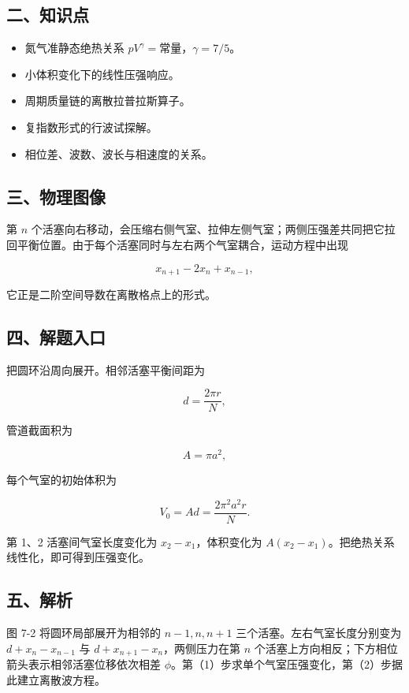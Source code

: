 \documentclass[12pt,a4paper,UTF8]{ctexart}
\newcommand{\tightlist}{\setlength{\itemsep}{0pt}\setlength{\parskip}{0pt}}
\begin{document}
\subsection{二、知识点}\label{ux4e8cux77e5ux8bc6ux70b9-6}

\begin{itemize}
\tightlist
\item
  氮气准静态绝热关系 \(pV^\gamma=\text{常量}\)，\(\gamma=7/5\)。
\item
  小体积变化下的线性压强响应。
\item
  周期质量链的离散拉普拉斯算子。
\item
  复指数形式的行波试探解。
\item
  相位差、波数、波长与相速度的关系。
\end{itemize}

\subsection{三、物理图像}\label{ux4e09ux7269ux7406ux56feux50cf-6}

第 \(n\)
个活塞向右移动，会压缩右侧气室、拉伸左侧气室；两侧压强差共同把它拉回平衡位置。由于每个活塞同时与左右两个气室耦合，运动方程中出现

\[x_{n+1}-2x_n+x_{n-1},\]

它正是二阶空间导数在离散格点上的形式。

\subsection{四、解题入口}\label{ux56dbux89e3ux9898ux5165ux53e3-6}

把圆环沿周向展开。相邻活塞平衡间距为

\[d=\frac{2\pi r}{N},\]

管道截面积为

\[A=\pi a^2,\]

每个气室的初始体积为

\[V_0=Ad=\frac{2\pi^2a^2r}{N}.\]

第 1、2 活塞间气室长度变化为 \(x_2-x_1\)，体积变化为
\(A(x_2-x_1)\)。把绝热关系线性化，即可得到压强变化。

\subsection{五、解析}\label{ux4e94ux89e3ux6790-6}

图 7-2 将圆环局部展开为相邻的 \(n-1,n,n+1\)
三个活塞。左右气室长度分别变为 \(d+x_n-x_{n-1}\) 与
\(d+x_{n+1}-x_n\)，两侧压力在第 \(n\)
个活塞上方向相反；下方相位箭头表示相邻活塞位移依次相差
\(\phi\)。第（1）步求单个气室压强变化，第（2）步据此建立离散波方程。
\end{document}

